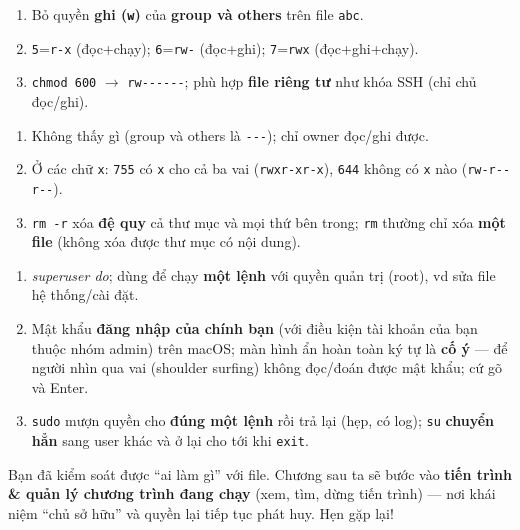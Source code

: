\documentclass[12pt,a4paper]{article}
\newcommand{\cmd}[1]{\texttt{#1}}
\begin{document}
\begin{checkbox}[Đáp án 5.5]
\begin{enumerate}
\item Bỏ quyền \textbf{ghi (\cmd{w})} của \textbf{group và others} trên file
  \cmd{abc}.
\item \cmd{5}=\cmd{r-x} (đọc+chạy); \cmd{6}=\cmd{rw-} (đọc+ghi); \cmd{7}=\cmd{rwx}
  (đọc+ghi+chạy).
\item \cmd{chmod 600} $\rightarrow$ \cmd{rw-{}-{}-{}-{}-{}-}; phù hợp \textbf{file riêng tư} như
  khóa SSH (chỉ chủ đọc/ghi).
\end{enumerate}
\end{checkbox}

\begin{checkbox}[Đáp án 5.6]
\begin{enumerate}
\item Không thấy gì (group và others là \cmd{-{}-{}-}); chỉ owner đọc/ghi được.
\item Ở các chữ \cmd{x}: \cmd{755} có \cmd{x} cho cả ba vai (\cmd{rwxr-xr-x}),
  \cmd{644} không có \cmd{x} nào (\cmd{rw-r-{}-r-{}-}).
\item \cmd{rm -r} xóa \textbf{đệ quy} cả thư mục và mọi thứ bên trong; \cmd{rm}
  thường chỉ xóa \textbf{một file} (không xóa được thư mục có nội dung).
\end{enumerate}
\end{checkbox}

\begin{checkbox}[Đáp án 5.7]
\begin{enumerate}
\item \textit{superuser do}; dùng để chạy \textbf{một lệnh} với quyền quản trị
  (root), vd sửa file hệ thống/cài đặt.
\item Mật khẩu \textbf{đăng nhập của chính bạn} (với điều kiện tài khoản của bạn
  thuộc nhóm admin) trên macOS; màn hình ẩn hoàn toàn ký tự là \textbf{cố ý} --- để
  người nhìn qua vai (shoulder surfing) không đọc/đoán được mật khẩu; cứ gõ và Enter.
\item \cmd{sudo} mượn quyền cho \textbf{đúng một lệnh} rồi trả lại (hẹp, có log);
  \cmd{su} \textbf{chuyển hẳn} sang user khác và ở lại cho tới khi \cmd{exit}.
\end{enumerate}
\end{checkbox}

\vspace{1cm}
\begin{notebox}
Bạn đã kiểm soát được ``ai làm gì'' với file. Chương sau ta sẽ bước vào \textbf{tiến
trình \& quản lý chương trình đang chạy} (xem, tìm, dừng tiến trình) --- nơi khái
niệm ``chủ sở hữu'' và quyền lại tiếp tục phát huy. Hẹn gặp lại!
\end{notebox}
\end{document}
